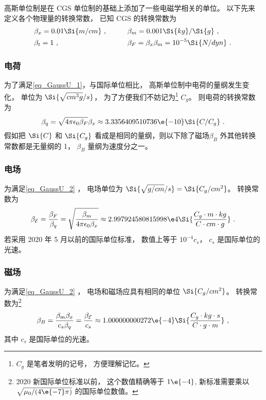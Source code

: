 

高斯单位制是在 CGS 单位制的基础上添加了一些电磁学相关的单位。 以下先来定义各个物理量的转换常数， 
已知 CGS 的转换常数为
\begin{equation}\label{eq_GaussU_3}
\begin{aligned}
&\beta_x = 0.01\Si{m/cm} ~,&\qquad &\beta_m = 0.001\Si{kg}/\Si{g}~,\\
&\beta_t = 1 ~,&\qquad  &\beta_F = \beta_x \beta_m = 10^{-5}\Si{N/dyn}~.
\end{aligned}
\end{equation}

\subsubsection{电荷}
为了满足\autoref{eq_GaussU_1}，与国际单位相比， 高斯单位制中电荷的量纲发生变化， 单位为 $\Si{\sqrt{cm^3 g}/s}$， 为了方便我们不妨记为\footnote{$C_g$ 是笔者发明的记号， 方便理解记忆。} $C_g$。 则电荷的转换常数为
\begin{equation}
\beta_q = \sqrt{4\pi\epsilon_0\beta_F} \beta_x \approx 3.3356409510736\e{-10} \Si{C/C_g}~.
\end{equation}
假如把 $\Si{C}$ 和 $\Si{C_g}$ 看成是相同的量纲，则以下除了磁场$\beta_B$ 外其他转换常数都是无量纲的 1， $\beta_B$ 量纲为速度分之一。

\subsubsection{电场}
为满足\autoref{eq_GaussU_2} ， 电场单位为 $\Si{\sqrt{g/cm}/s} = \Si{C_g/cm^2}$。 转换常数为
\begin{equation}
\beta_{\mathcal E} = \frac{\beta_F}{\beta_q} = \sqrt{\frac{\beta_m}{4\pi\epsilon_0 \beta_x}} \approx 2.997924580815998\e4 \Si{\frac{C_g\cdot m\cdot kg}{C\cdot cm\cdot g}}~.
\end{equation}
若采用 2020 年 5 月以前的国际单位标准， 数值上等于 $10^{-4} c_{s}$， $c_{s}$ 是国际单位的光速。

\subsubsection{磁场}
为满足\autoref{eq_GaussU_2} ， 电场和磁场应具有相同的单位 $\Si{C_g/cm^2}$。 转换常数为\footnote{2020 新国际单位标准以前， 这个数值精确等于 $1\e{-4}$, 新标准需要乘以 $\sqrt{\mu_0/(4\e{-7}\pi)}$ 的国际单位数值。}
\begin{equation}
\beta_B = \frac{\beta_m\beta_x}{c_s\beta_q} = \frac{\beta_{\mathcal E}}{c_s} \approx 1.000000000272\e{-4} \Si{\frac{C_g\cdot kg \cdot s}{C \cdot g \cdot m}}~,
\end{equation}
其中 $c_{s}$ 是国际单位的光速。

